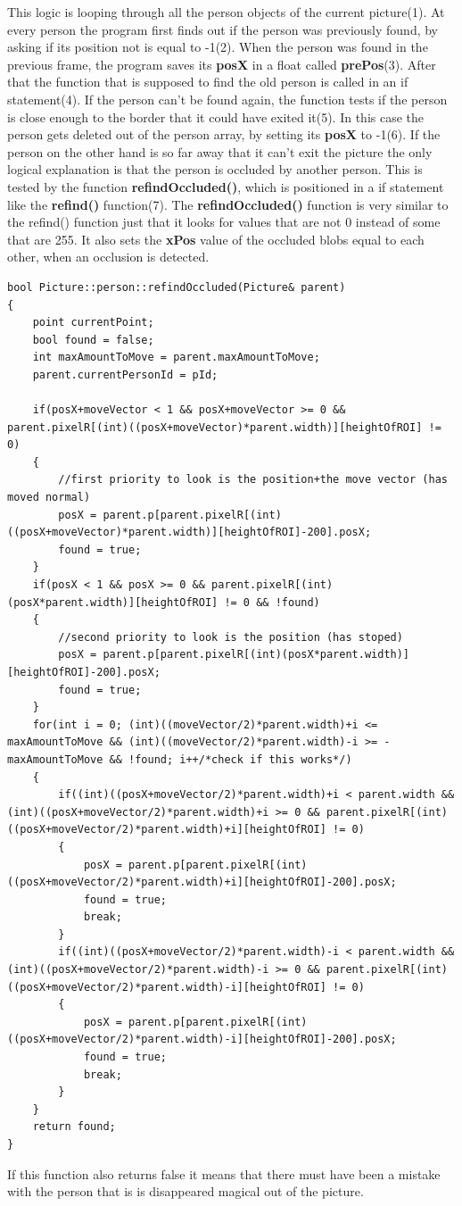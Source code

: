 This logic is looping through all the person objects of the current picture(1). At every person the program first finds out if the person was previously found, by asking if its position not is equal to -1(2). When the person was found in the previous frame, the program saves its \textbf{posX} in a float called \textbf{prePos}(3). After that the function that is supposed to find the old person is called in an if statement(4). If the person can't be found again, the function tests if the person is close enough to the border that it could have exited it(5). In this case the person gets deleted out of the person array, by setting its \textbf{posX} to -1(6). If the person on the other hand is so far away that it can't exit the picture the only logical explanation is that the person is occluded by another person. This is tested by the function \textbf{refindOccluded()}, which is positioned in a if statement like the \textbf{refind()} function(7). The \textbf{refindOccluded()} function is very similar to the refind() function just that it looks for values that are not 0 instead of some that are 255. It also sets the \textbf{xPos} value of the occluded blobs equal to each other, when an occlusion is detected.
\begin{lstlisting}
bool Picture::person::refindOccluded(Picture& parent)
{
	point currentPoint;
	bool found = false;
	int maxAmountToMove = parent.maxAmountToMove;
	parent.currentPersonId = pId;

	if(posX+moveVector < 1 && posX+moveVector >= 0 && parent.pixelR[(int)((posX+moveVector)*parent.width)][heightOfROI] != 0)
	{
		//first priority to look is the position+the move vector (has moved normal)
		posX = parent.p[parent.pixelR[(int)((posX+moveVector)*parent.width)][heightOfROI]-200].posX;
		found = true;
	} 
	if(posX < 1 && posX >= 0 && parent.pixelR[(int)(posX*parent.width)][heightOfROI] != 0 && !found)
	{
		//second priority to look is the position (has stoped)
		posX = parent.p[parent.pixelR[(int)(posX*parent.width)][heightOfROI]-200].posX;
		found = true;
	} 
	for(int i = 0; (int)((moveVector/2)*parent.width)+i <= maxAmountToMove && (int)((moveVector/2)*parent.width)-i >= -maxAmountToMove && !found; i++/*check if this works*/)
	{
		if((int)((posX+moveVector/2)*parent.width)+i < parent.width && (int)((posX+moveVector/2)*parent.width)+i >= 0 && parent.pixelR[(int)((posX+moveVector/2)*parent.width)+i][heightOfROI] != 0)
		{
			posX = parent.p[parent.pixelR[(int)((posX+moveVector/2)*parent.width)+i][heightOfROI]-200].posX;
			found = true;
			break;
		}
		if((int)((posX+moveVector/2)*parent.width)-i < parent.width && (int)((posX+moveVector/2)*parent.width)-i >= 0 && parent.pixelR[(int)((posX+moveVector/2)*parent.width)-i][heightOfROI] != 0)
		{
			posX = parent.p[parent.pixelR[(int)((posX+moveVector/2)*parent.width)-i][heightOfROI]-200].posX;
			found = true;
			break;
		}
	}
	return found;
}
\end{lstlisting}
If this function also returns false it means that there must have been a mistake with the person that is is disappeared magical out of the picture.

